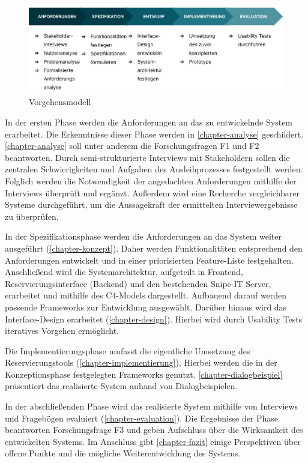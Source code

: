 \begin{figure}[h]
  \centering
  \includegraphics[scale=0.33]{Bilder/vorgehensmodel.png}
  \caption{Vorgehensmodell}
  \label{fig:vorgehen}
\end{figure}

In der ersten Phase werden die Anforderungen an das zu entwickelnde System
erarbeitet. Die Erkenntnisse dieser Phase werden in \ref{chapter-analyse}
geschildert. \ref{chapter-analyse} soll unter anderem die Forschungsfragen F1
und F2 beantworten. Durch semi-strukturierte Interviews mit Stakeholdern sollen
die zentralen Schwierigkeiten und Aufgaben des Ausleihprozesses festgestellt
werden. Folglich werden die Notwendigkeit der angedachten Anforderungen mithilfe
der Interviews überprüft und ergänzt. Außerdem wird eine Recherche
vergleichbarer Systeme durchgeführt, um die Aussagekraft der ermittelten
Interviewergebnisse zu überprüfen.

In der Spezifikationsphase werden die Anforderungen an das System weiter
ausgeführt (\ref{chapter-konzept}). Daher werden Funktionalitäten
entsprechend den Anforderungen entwickelt und in einer priorisierten
Feature-Liste festgehalten. Anschließend wird die Systemarchitektur, aufgeteilt
in Frontend, Reservierungsinterface (Backend) und den bestehenden Snipe-IT
Server, erarbeitet und mithilfe des C4-Models dargestellt. Aufbauend darauf
werden passende Frameworks zur Entwicklung ausgewählt. Darüber hinaus wird das
Interface-Design erarbeitet (\ref{chapter-design}). Hierbei wird durch Usability
Tests iteratives Vorgehen ermöglicht.


Die Implementierungsphase umfasst die eigentliche Umsetzung des
Reservierungstools (\ref{chapter-implementierung}). Hierbei werden die in der
Konzeptionsphase festgelegten Frameworks genutzt. \ref{chapter-dialogbeispiel}
präsentiert das realisierte System anhand von Dialogbeispielen.

In der abschließenden Phase wird das realisierte System mithilfe von Interviews
und Fragebögen evaluiert (\ref{chapter-evaluation}). Die Ergebnisse der Phase
beantworten Forschungsfrage F3 und geben Aufschluss über die Wirksamkeit des
entwickelten Systems. Im Anschluss gibt \ref{chapter-fazit} einige Perspektiven
über offene Punkte und die mögliche Weiterentwicklung des Systems.